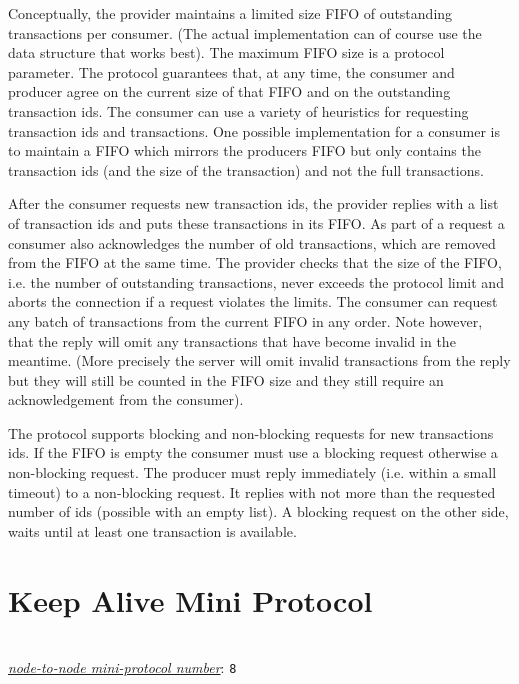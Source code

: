Conceptually, the provider maintains a limited size FIFO of outstanding transactions per consumer.
(The actual implementation can of course use the data structure that works best).
The maximum FIFO size is a protocol parameter.
The protocol guarantees that, at any time, the consumer and producer agree on the current size of
that FIFO and on the outstanding transaction ids.
The consumer can use a variety of heuristics for requesting transaction ids and transactions.
One possible implementation for a consumer is to maintain a FIFO which mirrors the producers FIFO
but only contains the transaction ids (and the size of the transaction) and not the full transactions.

After the consumer requests new transaction ids, the provider replies with a list of transaction ids and
puts these transactions in its FIFO.
As part of a request a consumer also acknowledges the number of old transactions,
which are removed from the FIFO at the same time.
The provider checks that the size of the FIFO, i.e. the number of outstanding transactions,
never exceeds the protocol limit and aborts the connection if a request violates the limits.
The consumer can request any batch of transactions from the current FIFO in any order.
Note however, that the reply will omit any transactions that have become invalid in the meantime.
(More precisely the server will omit invalid transactions from the reply but they will still be counted in the FIFO
size and they still require an acknowledgement from the consumer).

The protocol supports blocking and non-blocking requests for new transactions ids.
If the FIFO is empty the consumer must use a blocking request
otherwise a non-blocking request.
The producer must reply immediately (i.e. within a small timeout) to a non-blocking request.
It replies with not more than the requested number of ids (possible with an empty list).
A blocking request on the other side, waits until at least one transaction is available.

\section{Keep Alive Mini Protocol}
\\
\hyperref[table:node-to-node-protocol-numbers]{\textit{node-to-node mini-protocol number}}: \texttt{8}\\

